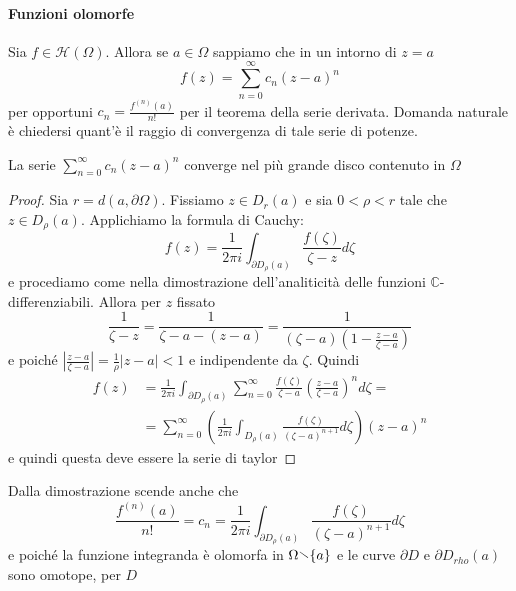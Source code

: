 \paragraph{Funzioni olomorfe}
Sia \(f \in \mathcal{H}{(\Omega)}\). Allora se \(a \in \Omega\) sappiamo che in
un intorno di \(z = a\) 
\[
    f{(z)} = \sum_{n=0}^{\infty} c_{n} {(z-a)}^{n}
\]
per opportuni \(\displaystyle c_{n} = \frac{f^{{(n)}}{(a)}}{n!}\) per il teorema
della serie derivata. Domanda naturale è chiedersi quant'è il raggio di
convergenza di tale serie di potenze. 
\begin{proposition}
    La serie \(\sum_{n=0}^{\infty} c_{n} {(z-a)}^{n}\) converge nel più grande
    disco contenuto in \(\Omega\) 
\end{proposition}
\begin{figure}[ht]
    \centering
\end{figure}
\begin{proof}
    Sia \(r = d(a, \partial \Omega)\). Fissiamo \(z \in D_{r} {(a)}\) e sia
    \(0< \rho < r\) tale che \(z \in D_{\rho} {(a)}\). Applichiamo la formula di
    Cauchy:
    \[
        f{(z)} = \frac{1}{2\pi i} \int_{\partial D_{\rho} {(a)}}
        \frac{f{(\zeta)}}{\zeta-z}d \zeta
    \]
    e procediamo come nella dimostrazione dell'analiticità delle funzioni
    $\mathbb{C}$-differenziabili. Allora per \(z\) fissato
    \[
        \frac{1}{\zeta - z} = \frac{1}{\zeta - a - {(z-a)}} = \frac{1}{{(\zeta -
        a)}{(1 - \frac{z-a}{\zeta-a})}}
    \]
    e poiché \(\displaystyle \left| \frac{z-a}{\zeta-a} \right| =
    \frac{1}{\rho}|z-a| < 1\) e indipendente da \(\zeta\). Quindi
    \begin{align*}
        f{(z)} &= \frac{1}{2 \pi i} \int_{\partial D_{\rho} {(a)}}
        \sum_{n=0}^{\infty} \frac{f{(\zeta)}}{\zeta -a} {\left( \frac{z-a}{\zeta
    -a} \right)}^{n} d \zeta = \\ &= \sum_{n=0}^{\infty} {\left( \frac{1}{2\pi i}
                \int_{D_\rho{(a)}} \frac{f{(\zeta)}}{{(\zeta-a)}^{n+1}} d
        \zeta\right)} {(z-a)}^{n}
    \end{align*}
    e quindi questa deve essere la serie di taylor
\end{proof}
Dalla dimostrazione scende anche che
\[
    \frac{f^{{(n)}}{(a)}}{n!} = c_{n} = \frac{1}{2\pi i} \int_{\partial D_{\rho}
    {(a)}} \frac{f{(\zeta)}}{{(\zeta - a)}^{n+1}} d \zeta
\]
e poiché la funzione integranda è olomorfa in \(\Omega \sminus \{a\} \) e le
curve \(\partial D\) e \(\partial D_{rho}{(a)} \) sono omotope, per \(D\)
